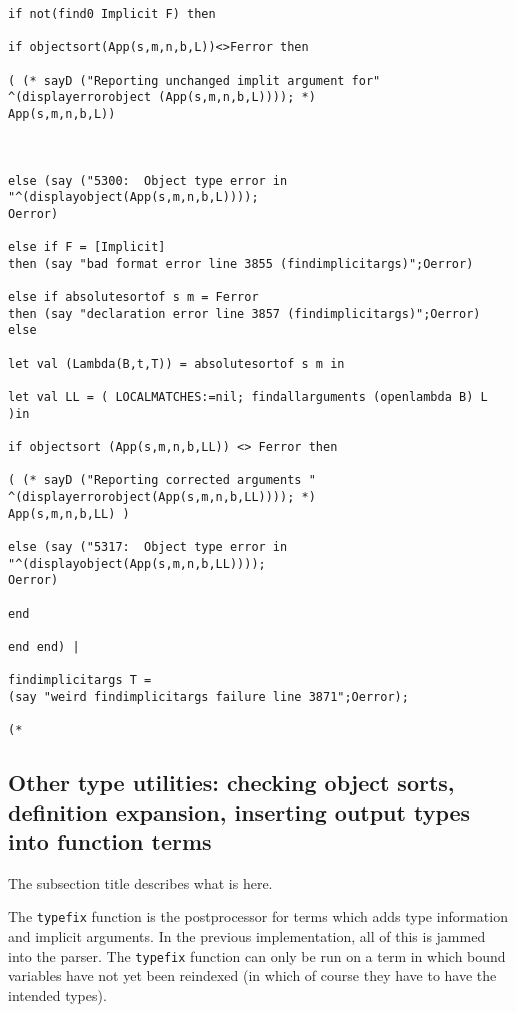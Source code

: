 \documentclass[12pt]{article}
\begin{document}
\begin{verbatim}
if not(find0 Implicit F) then 

if objectsort(App(s,m,n,b,L))<>Ferror then

( (* sayD ("Reporting unchanged implit argument for"
^(displayerrorobject (App(s,m,n,b,L)))); *)
App(s,m,n,b,L))



else (say ("5300:  Object type error in "^(displayobject(App(s,m,n,b,L))));
Oerror)

else if F = [Implicit] 
then (say "bad format error line 3855 (findimplicitargs)";Oerror)

else if absolutesortof s m = Ferror 
then (say "declaration error line 3857 (findimplicitargs)";Oerror) else

let val (Lambda(B,t,T)) = absolutesortof s m in

let val LL = ( LOCALMATCHES:=nil; findallarguments (openlambda B) L )in

if objectsort (App(s,m,n,b,LL)) <> Ferror then

( (* sayD ("Reporting corrected arguments "
^(displayerrorobject(App(s,m,n,b,LL)))); *)
App(s,m,n,b,LL) )

else (say ("5317:  Object type error in "^(displayobject(App(s,m,n,b,LL))));
Oerror)

end

end end) |

findimplicitargs T = 
(say "weird findimplicitargs failure line 3871";Oerror);

(*

\end{verbatim}

\subsection{Other type utilities:  checking object sorts, definition expansion, inserting output types into function terms}

The subsection title describes what is here.

The {\tt typefix} function is the postprocessor for terms which adds type information and implicit arguments.  In the previous implementation,
all of this is jammed into the parser.  The {\tt typefix} function can only be run on a term in which bound variables have not yet been reindexed (in which
of course they have to have the intended types).
\end{document}
